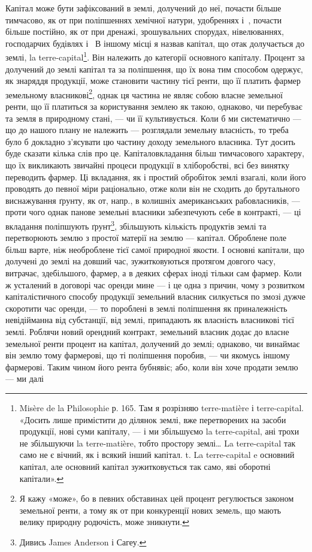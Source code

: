 Капітал може бути зафіксований в землі, долучений до неї, почасти
більше тимчасово, як от при поліпшеннях хемічної натури, удобреннях і~,
почасти більше постійно, як от при дренажі, зрошувальних спорудах, нівелюваннях,
господарчих будівлях і~ В іншому місці я назвав капітал, що
отак долучається до землі, la terre-capital\footnote{
Misère de la Philosophie р. 165. Там я розрізняю terre-matière і terre-capital. «Досить лише
примістити до ділянок землі, вже перетворених на засоби продукції, нові суми капіталу, — і ми
збільшуємо la terre-capital, ані трохи не збільшуючи la terre-matière, тобто простору землі\dots{} La
terre-capital так само не є вічний, як і всякий інший капітал. t. La terre-capital e основний
капітал, але основний капітал зужитковується так само, яві оборотні капітали».
}. Він належить до категорії основного
капіталу. Процент за долучений до землі капітал та за поліпшення, що їх вона
тим способом одержує, як знаряддя продукції, може становити частину тієї
ренти, що її платить фармер земельному власникові\footnote{
Я кажу «може», бо в певних обставинах цей процент регулюється законом земельної ренти, а тому як
от при конкуренції нових земель, що мають велику природну родючість, може зникнути.
}, однак ця частина не
являє собою власне земельної ренти, що її платиться за користування землею
як такою, однаково, чи перебуває та земля в природному стані, — чи її культивується.
Коли б ми систематично — що до нашого плану не належить — розглядали
земельну власність, то треба було б докладно з’ясувати цю частину
доходу земельного власника. Тут досить буде сказати кілька слів про це.
Капіталовкладання більш тимчасового характеру, що їх викликають звичайні
процеси продукції в хліборобстві, всі без винятку переводить фармер. Ці вкладання,
як і простий обробіток землі взагалі, коли його проводять до певної
міри раціонально, отже коли він не сходить до брутального виснажування
ґрунту, як от, напр., в колишніх американських рабовласників, — проти чого
однак панове земельні власники забезпечують себе в контракті, — ці вкладання
поліпшують ґрунт\footnote{
Дивись James Anderson і Сагеу.
}, збільшують кількість продуктів землі та перетворюють
землю з простої матерії на землю — капітал. Оброблене поле більш варте, ніж
необроблене тієї самої природної якости. І основні капітали, що долучені до
землі на довший час, зужитковуються протягом довгого часу, витрачає, здебільшого,
фармер, а в деяких сферах іноді тільки сам фармер. Коли ж усталений в
договорі час оренди мине — і це одна з причин, чому з розвитком капіталістичного
способу продукції земельний власник силкується по змозі дужче скоротити
час оренди, — то пороблені в землі поліпшення як приналежність невідійманна
від субстанції, від землі, припадають як власність власникові тієї землі.
Роблячи новий орендний контракт, земельний власник додає до власне земельної
ренти процент на капітал, долучений до землі; однаково, чи винаймає він землю
тому фармерові, що ті поліпшення поробив, — чи якомусь іншому фармерові.
Таким чином його рента бубнявіє; або, коли він хоче продати землю — ми далі
\parbreak{}  %

